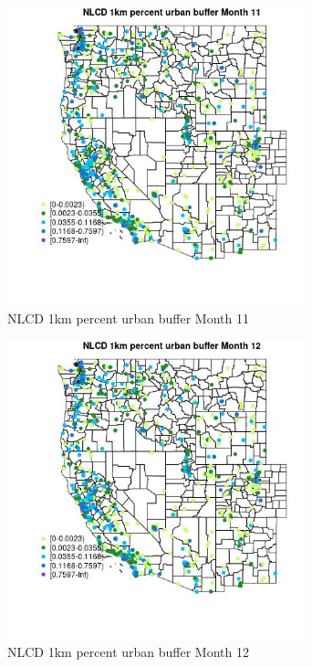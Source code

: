 \begin{figure} 
\centering  
\includegraphics[width=0.77\textwidth]{Code_Outputs/Report_ML_input_PM25_Step4_part_f_de_duplicated_aves_prioritize_24hr_obswNAs_MapObsMo11NLCD_1km_percent_urban_buffer.jpg} 
\caption{\label{fig:Report_ML_input_PM25_Step4_part_f_de_duplicated_aves_prioritize_24hr_obswNAsMapObsMo11NLCD_1km_percent_urban_buffer}NLCD 1km percent urban buffer Month 11} 
\end{figure} 
 

\begin{figure} 
\centering  
\includegraphics[width=0.77\textwidth]{Code_Outputs/Report_ML_input_PM25_Step4_part_f_de_duplicated_aves_prioritize_24hr_obswNAs_MapObsMo12NLCD_1km_percent_urban_buffer.jpg} 
\caption{\label{fig:Report_ML_input_PM25_Step4_part_f_de_duplicated_aves_prioritize_24hr_obswNAsMapObsMo12NLCD_1km_percent_urban_buffer}NLCD 1km percent urban buffer Month 12} 
\end{figure} 
 

